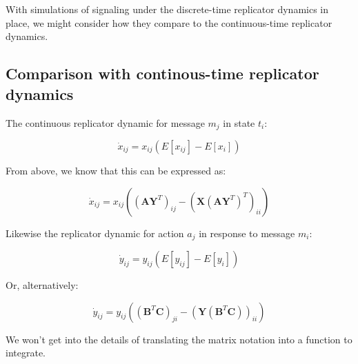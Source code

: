 \documentclass{article}
\begin{document}
    \begin{center}
    \end{center}
    { \hspace*{\fill} \\}
    
    \begin{center}
    \end{center}
    { \hspace*{\fill} \\}
    
    With simulations of signaling under the discrete-time replicator
dynamics in place, we might consider how they compare to the
continuous-time replicator dynamics.

    \subsection{Comparison with continous-time replicator
dynamics}\label{comparison-with-continous-time-replicator-dynamics}

    The continuous replicator dynamic for message $m_j$ in state $t_i$:

\begin{equation}
    \dot{x}_{ij} = x_{ij}(E[x_{ij}] - E[x_i])
\end{equation}

From above, we know that this can be expressed as:

\begin{equation}
    \dot{x}_{ij} = x_{ij}((\textbf{A}\textbf{Y}^T)_{ij} - (\textbf{X}(\textbf{A}\textbf{Y}^T)^T)_{ii})
\end{equation}

Likewise the replicator dynamic for action $a_j$ in response to message
$m_i$:

\begin{equation}
    \dot{y}_{ij} = y_{ij}(E[y_{ij}] - E[y_i])
\end{equation}

Or, alternatively:

\begin{equation}
    \dot{y}_{ij} = y_{ij}( (\textbf{B}^T\textbf{C})_{ji} - (\textbf{Y}(\textbf{B}^T\textbf{C}))_{ii})
\end{equation}

    We won't get into the details of translating the matrix notation into a
function to integrate.
\end{document}
